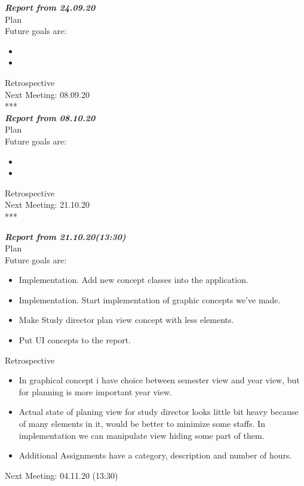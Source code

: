 \documentclass{scrartcl}
\begin{document}
\textbf{\textit{Report from 24.09.20  }}\\
Plan\\
Future goals are: 
\begin{itemize}


	\item 
	\item 
\end{itemize}	
Retrospective\\

Next Meeting: 08.09.20\\
\**** \\
\textbf{\textit{Report from 08.10.20  }}\\
Plan\\
Future goals are: 
\begin{itemize}


	\item 
	\item 
\end{itemize}	
Retrospective\\
 
Next Meeting: 21.10.20\\


\****

\textbf{\textit{Report from 21.10.20(13:30)  }}\\
Plan\\
Future goals are: 
\begin{itemize}
    \item Implementation. Add new concept classes into the application. 
  	\item  Implementation. Start implementation of graphic concepts we've made.
	\item Make Study director plan view concept with less elements.
	\item Put UI concepts to the report.
\end{itemize}	
Retrospective\\
\begin{itemize}
\item In graphical concept i have choice between semester view and year view, but for planning is more important year view.
\item Actual state of planing view for study director looks little bit heavy because of many elements in it, would be better to minimize some staffs. In implementation we can manipulate view hiding some part of them. 

\item Additional Assignments have a category, description and number of hours.

\end{itemize}
Next Meeting: 04.11.20 (13:30)\\
\end{document}
